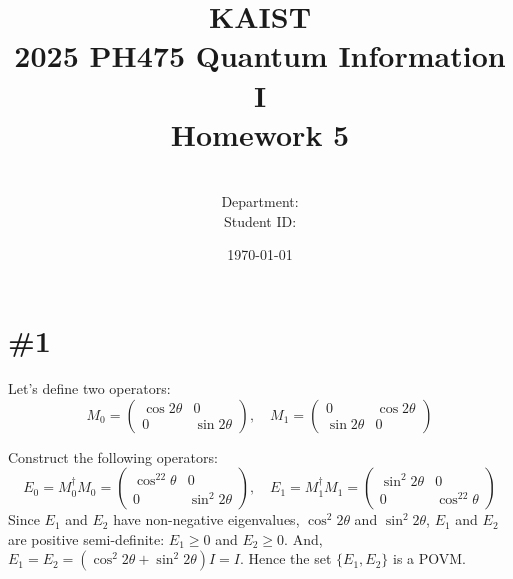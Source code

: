 \documentclass[a4paper,11pt]{article}
\title{KAIST\\2025 PH475 Quantum Information I\\
Homework 5\bigskip}
\author{\textbf{\Large \name} \\
Department: \department\\
Student ID: \studentid}
\date{\today}
\begin{document}
\thispagestyle{empty}
\maketitle
\tableofcontents
{}

\newcommand{\der}[2][]{\frac{d #1}{d #2}}
\newcommand{\pder}[2][]{\frac{\partial #1}{\partial #2}}
\newcommand{\grad}{\operatorname{grad}}
\newcommand{\diver}{\operatorname{div}}
\newcommand{\curl}{\operatorname{curl}}
\newcommand{\tr}{\operatorname{tr}}

\newcommand{\cnot}{C_{\text{NOT}}}
\newcommand{\cz}{C_{Z}}

\section{\#1}
Let's define two operators:
\begin{equation}
    M_0=\begin{pmatrix}
        \cos 2\theta & 0 \\
        0 & \sin 2\theta
    \end{pmatrix},
    \quad
    M_1=\begin{pmatrix}
        0 & \cos 2\theta \\
        \sin 2\theta & 0
    \end{pmatrix}
\end{equation}

Construct the following operators:
\begin{equation}
    E_0=M_0^\dagger M_0=\begin{pmatrix}
        \cos^22\theta & 0 \\
        0 & \sin^2 2\theta
    \end{pmatrix},\quad
    E_1=M_1^\dagger M_1=\begin{pmatrix}
        \sin^2 2\theta & 0 \\
        0 & \cos^22\theta
    \end{pmatrix}
\end{equation}
Since $E_1$ and $E_2$ have non-negative eigenvalues, $\cos^2 2\theta$ and $\sin^2 2\theta$, $E_1$ and $E_2$ are positive semi-definite: $E_1\geq 0$ and $E_2\geq 0$. And, $E_1=E_2=(\cos^2 2\theta +\sin^2 2\theta)I=I$. Hence the set $\{E_1, E_2\}$ is a POVM.
\end{document}
